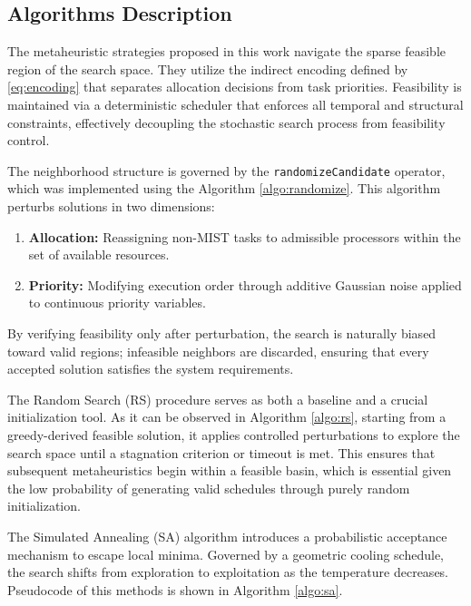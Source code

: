 \documentclass[11pt,a4paper]{article}
\begin{document}
\subsection{Algorithms Description}

%

The metaheuristic strategies proposed in this work navigate the sparse feasible region of the search space. They utilize the indirect encoding defined by \ref{eq:encoding} that separates allocation decisions from task priorities. Feasibility is maintained via a deterministic scheduler that enforces all temporal and structural constraints, effectively decoupling the stochastic search process from feasibility control.

The neighborhood structure is governed by the \texttt{randomizeCandidate} operator, which was implemented using the Algorithm \ref{algo:randomize}. This algorithm perturbs solutions in two dimensions: 

\begin{enumerate}
    \item \textbf{Allocation:} Reassigning non-MIST tasks to admissible processors within the set of available resources.
    \item \textbf{Priority:} Modifying execution order through additive Gaussian noise applied to continuous priority variables.
\end{enumerate}



By verifying feasibility only after perturbation, the search is naturally biased toward valid regions; infeasible neighbors are discarded, ensuring that every accepted solution satisfies the system requirements.

The Random Search (RS) procedure serves as both a baseline and a crucial initialization tool. As it can be observed in Algorithm \ref{algo:rs}, starting from a greedy-derived feasible solution, it applies controlled perturbations to explore the search space until a stagnation criterion or timeout is met. This ensures that subsequent metaheuristics begin within a feasible basin, which is essential given the low probability of generating valid schedules through purely random initialization.



The Simulated Annealing (SA) algorithm introduces a probabilistic acceptance mechanism to escape local minima. Governed by a geometric cooling schedule, the search shifts from exploration to exploitation as the temperature decreases. Pseudocode of this methods is shown in Algorithm \ref{algo:sa}.
\end{document}
